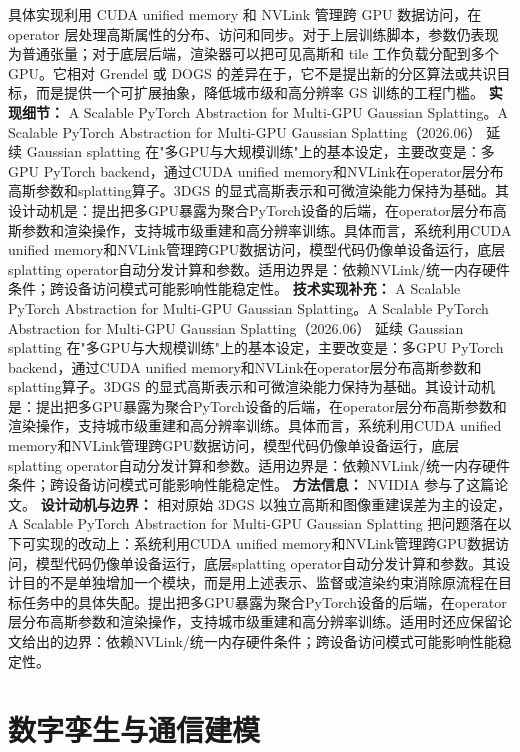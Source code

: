 具体实现利用 CUDA unified memory 和 NVLink 管理跨 GPU 数据访问，在 operator 层处理高斯属性的分布、访问和同步。对于上层训练脚本，参数仍表现为普通张量；对于底层后端，渲染器可以把可见高斯和 tile 工作负载分配到多个 GPU。它相对 Grendel 或 DOGS 的差异在于，它不是提出新的分区算法或共识目标，而是提供一个可扩展抽象，降低城市级和高分辨率 GS 训练的工程门槛。
\textbf{实现细节：} A Scalable PyTorch Abstraction for Multi-GPU Gaussian Splatting。A Scalable PyTorch Abstraction for Multi-GPU Gaussian Splatting（2026.06） 延续 Gaussian splatting 在"多GPU与大规模训练"上的基本设定，主要改变是：多GPU PyTorch backend，通过CUDA unified memory和NVLink在operator层分布高斯参数和splatting算子。3DGS 的显式高斯表示和可微渲染能力保持为基础。其设计动机是：提出把多GPU暴露为聚合PyTorch设备的后端，在operator层分布高斯参数和渲染操作，支持城市级重建和高分辨率训练。具体而言，系统利用CUDA unified memory和NVLink管理跨GPU数据访问，模型代码仍像单设备运行，底层splatting operator自动分发计算和参数。适用边界是：依赖NVLink/统一内存硬件条件；跨设备访问模式可能影响性能稳定性。
\textbf{技术实现补充：} A Scalable PyTorch Abstraction for Multi-GPU Gaussian Splatting。A Scalable PyTorch Abstraction for Multi-GPU Gaussian Splatting（2026.06） 延续 Gaussian splatting 在"多GPU与大规模训练"上的基本设定，主要改变是：多GPU PyTorch backend，通过CUDA unified memory和NVLink在operator层分布高斯参数和splatting算子。3DGS 的显式高斯表示和可微渲染能力保持为基础。其设计动机是：提出把多GPU暴露为聚合PyTorch设备的后端，在operator层分布高斯参数和渲染操作，支持城市级重建和高分辨率训练。具体而言，系统利用CUDA unified memory和NVLink管理跨GPU数据访问，模型代码仍像单设备运行，底层splatting operator自动分发计算和参数。适用边界是：依赖NVLink/统一内存硬件条件；跨设备访问模式可能影响性能稳定性。
\textbf{方法信息：} NVIDIA 参与了这篇论文。
\textbf{设计动机与边界：} 相对原始 3DGS 以独立高斯和图像重建误差为主的设定，A Scalable PyTorch Abstraction for Multi-GPU Gaussian Splatting 把问题落在以下可实现的改动上：系统利用CUDA unified memory和NVLink管理跨GPU数据访问，模型代码仍像单设备运行，底层splatting operator自动分发计算和参数。其设计目的不是单独增加一个模块，而是用上述表示、监督或渲染约束消除原流程在目标任务中的具体失配。提出把多GPU暴露为聚合PyTorch设备的后端，在operator层分布高斯参数和渲染操作，支持城市级重建和高分辨率训练。适用时还应保留论文给出的边界：依赖NVLink/统一内存硬件条件；跨设备访问模式可能影响性能稳定性。

\section{数字孪生与通信建模}

